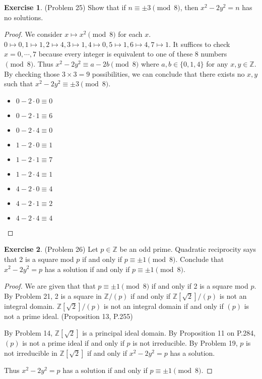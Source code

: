 \documentclass[12pt, psamsfonts]{amsart}
\theoremstyle{definition}
\newtheorem*{exer}{Exercise}
\theoremstyle{remark}
\numberwithin{equation}{section}
\begin{document}
\begin{exer}{(Problem 25)}
  Show that if $n \equiv \pm 3 \pmod 8$, then $x^2 - 2y^2 = n$ has no solutions.
\end{exer}

\begin{proof}
  We consider $x \mapsto x^2 \pmod 8$ for each $x$.
  $0 \mapsto 0, 1 \mapsto 1, 2 \mapsto 4, 3 \mapsto 1, 4 \mapsto 0, 5 \mapsto 1, 6 \mapsto 4, 7 \mapsto 1$.
  It suffices to check $x = 0, \cdots, 7$ because every integer is equivalent to one of these 8 numbers $\pmod 8$.
  Thus $x^2 - 2y^2 \equiv a - 2b \pmod 8$ where $a, b \in \{ 0, 1, 4 \}$ for any $x, y \in \mathbb{Z}$.
  By checking those $3 \times 3 = 9$ possibilities, we can conclude that there exists no $x, y$ such that $x^2 - 2y^2 \equiv \pm 3 \pmod 8$.

  \begin{itemize}
    \item
      $0 - 2 \cdot 0 \equiv 0$
    \item
      $0 - 2 \cdot 1 \equiv 6$
    \item
      $0 - 2 \cdot 4 \equiv 0$
    \item
      $1 - 2 \cdot 0 \equiv 1$
    \item
      $1 - 2 \cdot 1 \equiv 7$
    \item
      $1 - 2 \cdot 4 \equiv 1$
    \item
      $4 - 2 \cdot 0 \equiv 4$
    \item
      $4 - 2 \cdot 1 \equiv 2$
    \item
      $4 - 2 \cdot 4 \equiv 4$
  \end{itemize}
\end{proof}

\begin{exer}{(Problem 26)}
  Let $p \in \mathbb{Z}$ be an odd prime.
  Quadratic reciprocity says that 2 is a square mod $p$ if and only if $p \equiv \pm 1 \pmod 8$.
  Conclude that $x^2 - 2y^2 = p$ has a solution if and only if $p \equiv \pm 1 \pmod 8$.
\end{exer}


\begin{proof}
  We are given that that $p \equiv \pm 1 \pmod 8$ if and only if 2 is a square mod $p$.
  By Problem 21, 2 is a square in $\mathbb{Z}/(p)$ if and only if $\mathbb{Z}[\sqrt{2}]/(p)$ is not an integral domain.
  $\mathbb{Z}[\sqrt{2}]/(p)$ is not an integral domain if and only if $(p)$ is not a prime ideal.
  (Proposition 13, P.255)

  By Problem 14, $\mathbb{Z}[\sqrt{2}]$ is a principal ideal domain.
  By Proposition 11 on P.284, $(p)$ is not a prime ideal if and only if $p$ is not irreducible.
  By Problem 19, $p$ is not irreducible in $\mathbb{Z}[\sqrt{2}]$ if and only if $x^2 - 2y^2 = p$ has a solution.

  Thus $x^2 - 2y^2 = p$ has a solution if and only if $p \equiv \pm 1 \pmod 8$.
\end{proof}
\end{document}
